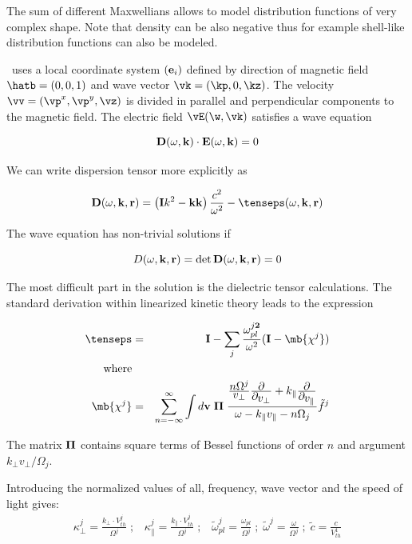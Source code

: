 \documentclass[a4,10pt]{article}
\begin{document}
The sum of different Maxwellians allows to model distribution functions of very complex shape. Note that density can be also negative thus for example shell-like distribution functions can also be modeled.



\WHAMP\ uses a local coordinate system $({\bf e}_{i})$ defined by direction of magnetic field
$\hatb=(0,0,1)$ and wave vector $\vk=(\kp,0,\kz)$.
The velocity $\vv=(\vp^x,\vp^y,\vz)$ is   divided
in parallel and perpendicular components to the magnetic field.
The electric field $\vE(\w,\vk)$ satisfies a wave equation

\[ {\bf D}(\omega,{\bf k})\cdot{\bf E}(\omega,{\bf k})=0 \]

We can write dispersion tensor  more explicitly as

\[ {\bf D}(\omega,{\bf k},{\bf r})=\left({\bf I}k^{2}-{\bf kk}\right)\frac{c^{2}}{\omega^{2}}
     -\tenseps(\omega,{\bf k},{\bf r}) \]


The wave equation has non-trivial solutions if

\[ D(\omega,{\bf k},{\bf r})=\det{{\bf D}(\omega,{\bf k},{\bf r})}=0 \]


The most difficult part in the solution is the
dielectric tensor calculations. The standard derivation within linearized kinetic
theory leads to the expression

\begin{eqnarray*}
        \tenseps & = & {\bf I}-\sum_{j}\frac{\omega_{pl}^{j {\bf 2}}}{\omega^{2}}({\bf I}-\mb{\chi^{j}})\\
\mbox{where}\\
        \mb{\chi^{j}} & = & \sum_{n=-\infty}^{\infty}\int d{\bf v}\;{\bf \Pi}\;
        \frac{\frac{\textstyle n\Omega^{j}}{\textstyle v_{\bot}}
        \frac{\textstyle \partial}{\textstyle \partial_{\textstyle v_{\bot}}}+
        k_{\|}\frac{\textstyle \partial}{\textstyle \partial_{\textstyle v_{\|}}}}
        {\omega-k_{\|}v_{\|}-n\Omega_{j}} \tilde{f}^{j}\\
\end{eqnarray*}

The matrix ${\bf \Pi}$ contains square terms of Bessel functions of order $n$ and
argument $k_{\bot}v_{\bot}/\Omega_{j}$.

Introducing the normalized values of all, frequency, wave vector and the speed of light gives:
\begin{gather}
\label{norm}
 \kappa _{\bot}^{j}=\frac{k_{\bot}\cdot V_{th}^{j}}{\Omega^{j}} \; ; \;\;\;
 \kappa _{\|}^{j}=\frac{k_{\|}\cdot V_{th}^{j}}{\Omega^{j}}     \; ; \;\;\;
 \tilde{\omega}_{pl}^{j}=\frac{\omega _{pl}}{\Omega^{j}} \; ; \;
 \tilde{\omega}^{j}=\frac{\omega}{\Omega^{j}}  \; ; \;
 \tilde{c}=\frac{c}{V_{th}^{1}}
\end{gather}
\end{document}
